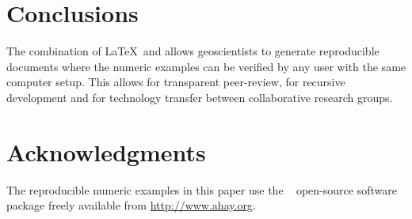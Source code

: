 

\section{Conclusions}
The combination of \LaTeX\ and \mg allows geoscientists to generate
reproducible documents where the numeric examples can be verified by
any user with the same computer setup. This allows for transparent
peer-review, for recursive development and for technology transfer
between collaborative research groups.

\section{Acknowledgments}
The reproducible numeric examples in this paper use the \mg~
open-source software package freely available from
\url{http://www.ahay.org}.




